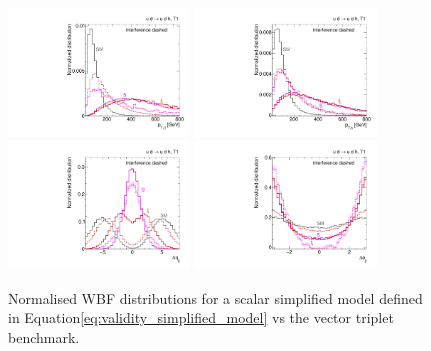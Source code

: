 \begin{figure}[t]
  \includegraphics[width=0.43\textwidth]{fig/validity/WBF_simplified_j1pt.pdf}
  \hspace*{0.05\textwidth}
  \includegraphics[width=0.43\textwidth]{fig/validity/WBF_simplified_Hpt.pdf} \\
  \includegraphics[width=0.43\textwidth]{fig/validity/WBF_simplified_deltaEtaJJ.pdf}
  \hspace*{0.05\textwidth}
  \includegraphics[width=0.43\textwidth]{fig/validity/WBF_simplified_deltaPhiJJ.pdf}
  \caption{Normalised WBF distributions for a scalar simplified model
    defined in Equation\;\eqref{eq:validity_simplified_model} vs the vector triplet
    benchmark.}
  \label{fig:validity_simplified}
\end{figure}

